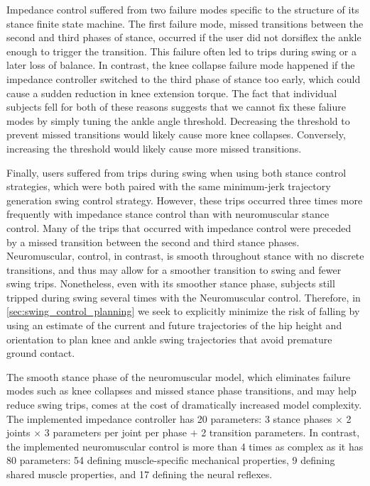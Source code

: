 Impedance control suffered from two failure modes specific to the structure of
its stance finite state machine. The first failure mode, missed transitions
between the second and third phases of stance, occurred if the user did not
dorsiflex the ankle enough to trigger the transition. This failure often
led to trips during swing or a later loss of balance. In contrast, the knee
collapse failure mode happened if the impedance controller switched to the third
phase of stance too early, which could cause a sudden reduction in knee
extension torque. The fact that individual subjects fell for both of these
reasons suggests that we cannot fix these faliure modes by simply tuning the
ankle angle threshold. Decreasing the threshold to prevent missed transitions
would likely cause more knee collapses. Conversely, increasing the threshold
would likely cause more missed transitions. 

Finally, users suffered from trips during swing when using both stance control
strategies, which were both paired with the same minimum-jerk trajectory
generation swing control strategy. However, these trips occurred three times
more frequently with impedance stance control than with neuromuscular stance
control. Many of the trips that occurred with impedance control were preceded by
a missed transition between the second and third stance phases. Neuromuscular,
control, in contrast, is smooth throughout stance with no discrete transitions,
and thus may allow for a smoother transition to swing and fewer swing trips.
Nonetheless, even with its smoother stance phase, subjects still tripped during
swing several times with the Neuromuscular control. Therefore, in
\cref{sec:swing_control_planning} we seek to explicitly minimize the risk of
falling by using an estimate of the current and future trajectories of the hip
height and orientation to plan knee and ankle swing trajectories that avoid
premature ground contact.

The smooth stance phase of the neuromuscular model, which eliminates failure
modes such as knee collapses and missed stance phase transitions, and may help
reduce swing trips, comes at the cost of dramatically increased model
complexity. The implemented impedance controller has 20 parameters: 3 stance
phases $\times$ 2 joints $\times$ 3 parameters per joint per phase $+$ 2
transition parameters. In contrast, the implemented neuromuscular control is
more than 4 times as complex as it has 80 parameters: 54 defining
muscle-specific mechanical properties, 9 defining shared muscle properties, and
17 defining the neural reflexes. 

